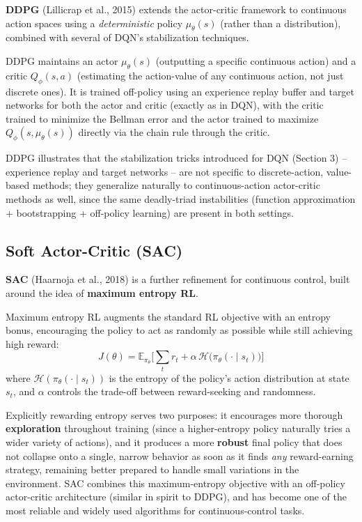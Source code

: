 \documentclass[12pt,a4paper]{article}
\begin{document}
\textbf{DDPG} (Lillicrap et al., 2015) extends the actor-critic framework to continuous action spaces using a \emph{deterministic} policy $\mu_\theta(s)$ (rather than a distribution), combined with several of DQN's stabilization techniques.

\begin{defbox}
DDPG maintains an actor $\mu_\theta(s)$ (outputting a specific continuous action) and a critic $Q_\phi(s,a)$ (estimating the action-value of any continuous action, not just discrete ones). It is trained off-policy using an experience replay buffer and target networks for both the actor and critic (exactly as in DQN), with the critic trained to minimize the Bellman error and the actor trained to maximize $Q_\phi(s,\mu_\theta(s))$ directly via the chain rule through the critic.
\end{defbox}

\begin{keyidea}
DDPG illustrates that the stabilization tricks introduced for DQN (Section 3) -- experience replay and target networks -- are not specific to discrete-action, value-based methods; they generalize naturally to continuous-action actor-critic methods as well, since the same deadly-triad instabilities (function approximation + bootstrapping + off-policy learning) are present in both settings.
\end{keyidea}

\subsection{Soft Actor-Critic (SAC)}

\textbf{SAC} (Haarnoja et al., 2018) is a further refinement for continuous control, built around the idea of \textbf{maximum entropy RL}.

\begin{defbox}
Maximum entropy RL augments the standard RL objective with an entropy bonus, encouraging the policy to act as randomly as possible while still achieving high reward:
\[
J(\theta) = \mathbb{E}_{\pi_\theta}\Big[\sum_t r_t + \alpha \, \mathcal{H}\big(\pi_\theta(\cdot\mid s_t)\big)\Big]
\]
where $\mathcal{H}(\pi_\theta(\cdot\mid s_t))$ is the entropy of the policy's action distribution at state $s_t$, and $\alpha$ controls the trade-off between reward-seeking and randomness.
\end{defbox}

\begin{keyidea}
Explicitly rewarding entropy serves two purposes: it encourages more thorough \textbf{exploration} throughout training (since a higher-entropy policy naturally tries a wider variety of actions), and it produces a more \textbf{robust} final policy that does not collapse onto a single, narrow behavior as soon as it finds \emph{any} reward-earning strategy, remaining better prepared to handle small variations in the environment. SAC combines this maximum-entropy objective with an off-policy actor-critic architecture (similar in spirit to DDPG), and has become one of the most reliable and widely used algorithms for continuous-control tasks.
\end{keyidea}
\end{document}
